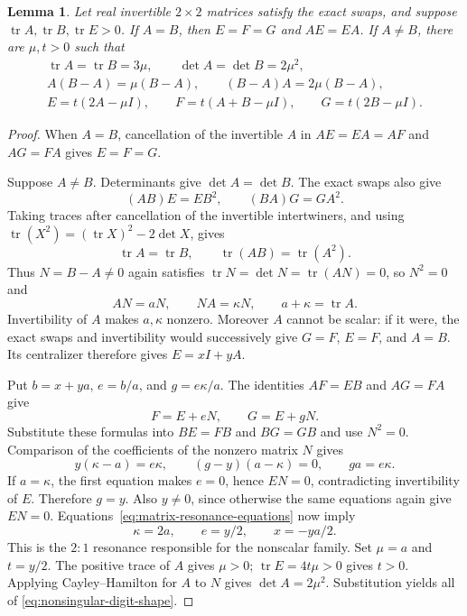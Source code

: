\documentclass[11pt,a4paper]{article}
\newtheorem{lemma}[theorem]{Lemma}
\newcommand{\tr}{\operatorname{tr}}
\begin{document}
\begin{lemma}\label{lem:matrix-nonsingular-shape}
Let real invertible $2\times2$ matrices satisfy the exact swaps, and
suppose $\tr A,\tr B,\tr E>0$. If $A=B$, then $E=F=G$ and $AE=EA$.
If $A\ne B$, there are $\mu,t>0$ such that
\begin{equation}\label{eq:nonsingular-digit-shape}
\begin{gathered}
\tr A=\tr B=3\mu,\qquad
\det A=\det B=2\mu^2,\\
A(B-A)=\mu(B-A),\qquad (B-A)A=2\mu(B-A),\\
E=t(2A-\mu I),\qquad
F=t(A+B-\mu I),\qquad G=t(2B-\mu I).
\end{gathered}
\end{equation}
\end{lemma}
\begin{proof}
When $A=B$, cancellation of the invertible $A$ in $AE=EA=AF$ and
$AG=FA$ gives $E=F=G$.

Suppose $A\ne B$. Determinants give $\det A=\det B$.
The exact swaps also give
\[
(AB)E=EB^2,\qquad (BA)G=GA^2.
\]
Taking traces after cancellation of the invertible intertwiners, and
using $\tr(X^2)=(\tr X)^2-2\det X$, gives
\[
\tr A=\tr B,\qquad \tr(AB)=\tr(A^2).
\]
Thus $N=B-A\ne0$ again satisfies
$\tr N=\det N=\tr(AN)=0$, so $N^2=0$ and
\[
AN=aN,\qquad NA=\kappa N,\qquad a+\kappa=\tr A.
\]
Invertibility of $A$ makes $a,\kappa$ nonzero.
Moreover $A$ cannot be scalar: if it were, the exact swaps and
invertibility would successively give $G=F$, $E=F$, and $A=B$.
Its centralizer therefore gives $E=xI+yA$.

Put $b=x+ya$, $e=b/a$, and $g=e\kappa/a$.
The identities $AF=EB$ and $AG=FA$ give
\[
F=E+eN,\qquad G=E+gN.
\]
Substitute these formulas into $BE=FB$ and $BG=GB$ and use $N^2=0$.
Comparison of the coefficients of the nonzero matrix $N$ gives
\begin{equation}\label{eq:matrix-resonance-equations}
y(\kappa-a)=e\kappa,\qquad
(g-y)(a-\kappa)=0,\qquad ga=e\kappa.
\end{equation}
If $a=\kappa$, the first equation makes $e=0$, hence $EN=0$,
contradicting invertibility of $E$. Therefore $g=y$.
Also $y\ne0$, since otherwise the same equations again give $EN=0$.
Equations~\eqref{eq:matrix-resonance-equations} now imply
\[
\kappa=2a,\qquad e=y/2,\qquad x=-ya/2.
\]
This is the $2:1$ resonance responsible for the nonscalar family.
Set $\mu=a$ and $t=y/2$. The positive trace of $A$ gives $\mu>0$;
$\tr E=4t\mu>0$ gives $t>0$. Applying Cayley--Hamilton for $A$ to
$N$ gives $\det A=2\mu^2$. Substitution yields all of
\eqref{eq:nonsingular-digit-shape}.
\end{proof}
\end{document}
